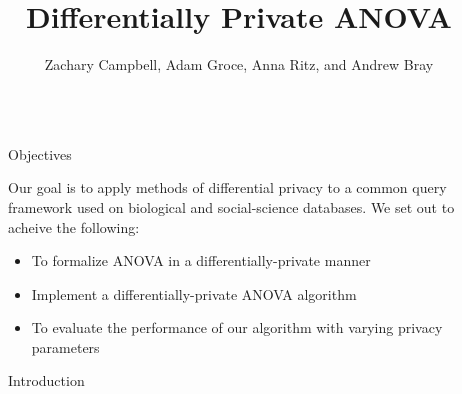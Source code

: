 \documentclass[final]{beamer}
\title{Differentially Private ANOVA} %
\author{Zachary Campbell, Adam Groce, Anna Ritz, and Andrew Bray} %
\institute{Reed College} %
\newlength{\sepwid}
\newlength{\onecolwid}
\begin{document}

\setlength{\belowcaptionskip}{2ex} %
\setlength\belowdisplayshortskip{2ex} %

\begin{frame}[t] %

\begin{columns}[t] %

\begin{column}{\sepwid}\end{column} %

\begin{column}{\onecolwid} %


\begin{alertblock}{Objectives}

Our goal is to apply methods of differential privacy to a common query framework used on biological and social-science databases. We set out to acheive the following:

\begin{itemize}
\item To formalize ANOVA in a differentially-private manner
\item Implement a differentially-private ANOVA algorithm 
\item To evaluate the performance of our algorithm with varying privacy parameters 
\end{itemize}

\end{alertblock}


\begin{block}{Introduction}


\end{block}
\end{column}
\end{columns}
\end{frame}
\end{document}
